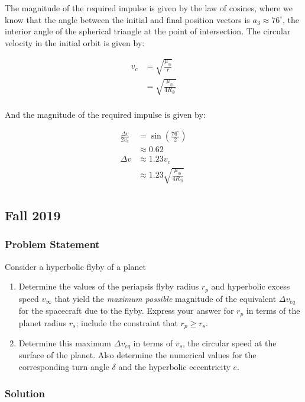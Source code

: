 The magnitude of the required impulse is given by the law of cosines, where we know that the angle between the initial and final position vectors is $a_3 \approx 76^\circ$, the interior angle of the spherical triangle at the point of intersection. The circular velocity in the initial orbit is given by:

\begin{align*}
    v_c &= \sqrt{\frac{\mu_\oplus}{r}} \\
    &= \sqrt{\frac{\mu_\oplus}{4R_\oplus}} \\
\end{align*}

And the magnitude of the required impulse is given by:

\begin{align*}
    \frac{\Delta v}{2 v_c} &= \sin\left( \frac{76^\circ}{2} \right) \\
    &\approx 0.62 \\
    \Delta v &\approx 1.23 v_c \\
    &\approx 1.23 \sqrt{\frac{\mu_\oplus}{4R_\oplus}} \\
\end{align*}

\subsection{Fall 2019}

\subsubsection{Problem Statement}
Consider a hyperbolic flyby of a planet

\begin{enumerate}
    \item Determine the values of the periapsis flyby radius $r_p$ and hyperbolic excess speed $v_\infty$ that yield the \textit{maximum possible} magnitude of the equivalent $\Delta v_{eq}$ for the spacecraft due to the flyby. Express your answer for $r_p$ in terms of the planet radius $r_s$; include the constraint that $r_p \geq r_s$.
    \item Determine this maximum $\Delta v_{eq}$ in terms of $v_s$, the circular speed at the surface of the planet. Also determine the numerical values for the corresponding turn angle $\delta$ and the hyperbolic eccentricity $e$.
\end{enumerate}

\subsubsection{Solution}

